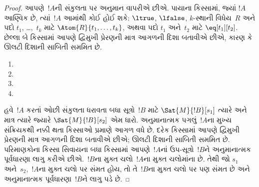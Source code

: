 \begin{proof}
આપણે~$!A$ની સંકુલતા પર અનુમાન વાપરીએ છીએ. પાયાના કિસ્સામાં, જ્યાં
$!A$ આણ્વિક છે, ત્યાં~$!A$ આમાંથી કોઈ હોઈ શકે:
$\ltrue$,
$\lfalse$,
$k$-સ્થાની વિધેય~$R$ અને પદો $t_1$, \dots,~$t_k$ માટે
$\Atom{R}{t_1,\dots,t_k}$, અથવા પદો $t_1$ અને~$t_2$ માટે
$\eq[t_1][t_2]$. છેલ્લા બે કિસ્સામાં આપણે દ્વિમુખી પ્રેરણની માત્ર આગળની દિશા
બતાવીએ છીએ, કારણ કે ઊલટી દિશાની સાબિતી સમમિત છે.

\begin{enumerate}
\item %

\item %

\item
\item
\end{enumerate}

હવે~$!A$ કરતાં ઓછી સંકુલતા ધરાવતા બધા સૂત્રો~$!B$ માટે
$\Sat{M}{!B}[s_1]$ ત્યારે અને માત્ર ત્યારે જ્યારે $\Sat{M}{!B}[s_2]$
એમ ધારો. અનુમાનાત્મક પગલું~$!A$ના મુખ્ય સંક્રિયકથી નક્કી થતા કિસ્સાઓ
પ્રમાણે આગળ વધે છે. દરેક કિસ્સામાં આપણે દ્વિમુખી પ્રેરણની માત્ર આગળની દિશા
બતાવીએ છીએ; ઊલટી દિશાની સાબિતી સમમિત છે. પરિમાણકોના કિસ્સા સિવાયના
બધા કિસ્સામાં આપણે~$!A$નાં ઉપ-સૂત્રો~$!B$ને અનુમાનાત્મક
પૂર્વધારણા લાગુ કરીએ છીએ.~$!B$ના મુક્ત ચલો~$!A$ના મુક્ત ચલોમાંના છે.
તેથી જો $s_1$ અને~$s_2$,~$!A$ના મુક્ત ચલો પર સંમત હોય, તો તે~$!B$ના
મુક્ત ચલો પર પણ સંમત છે અને અનુમાનાત્મક પૂર્વધારણા~$!B$ને લાગુ પડે છે.


\end{proof}
